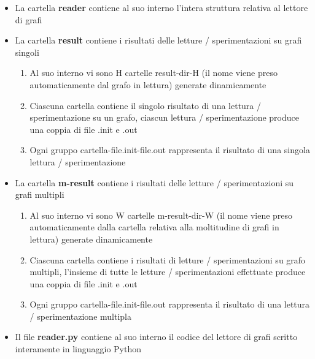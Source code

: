 \begin{itemize}
	\item La cartella \textbf{reader} contiene al suo interno l'intera struttura relativa al lettore di grafi
	\item La cartella \textbf{result} contiene i risultati delle letture / sperimentazioni su grafi singoli
	\begin{enumerate}
		\item Al suo interno vi sono H cartelle result-dir-H (il nome viene preso automaticamente dal grafo in lettura) generate dinamicamente
		\item Ciascuna cartella contiene il singolo risultato di una lettura / sperimentazione su un grafo, ciascun lettura / sperimentazione produce una coppia di file .init e .out
		\item Ogni gruppo cartella-file.init-file.out rappresenta il risultato di una singola lettura / sperimentazione 
	\end{enumerate}
	\item La cartella \textbf{m-result} contiene i risultati delle letture / sperimentazioni su grafi multipli
	\begin{enumerate}
		\item Al suo interno vi sono W cartelle m-result-dir-W (il nome viene preso automaticamente dalla cartella relativa alla moltitudine di grafi in lettura) generate dinamicamente
		\item Ciascuna cartella contiene i risultati di letture / sperimentazioni su grafo multipli, l'insieme di tutte le letture / sperimentazioni effettuate produce una coppia di file .init e .out
		\item Ogni gruppo cartella-file.init-file.out rappresenta il risultato di una lettura / sperimentazione multipla
	\end{enumerate}
	\item Il file \textbf{reader.py} contiene al suo interno il codice del lettore di grafi scritto interamente in linguaggio Python 
\end{itemize}

\newpage
{}

